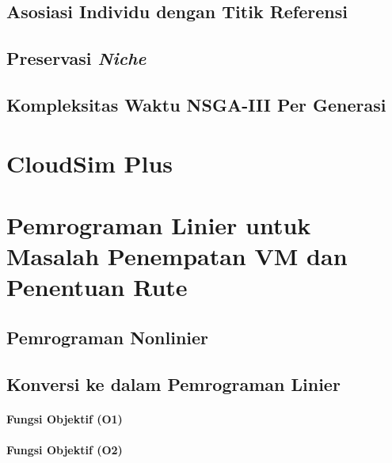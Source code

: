 \documentclass[ugmskripsi]{ugmskripsi}
\begin{document}
		\subsection{Asosiasi Individu dengan Titik Referensi}
			\label{asosiasi individu}
			
			
		\subsection{Preservasi \textit{Niche}}
			\label{preservasi niche}
			

		\subsection{Kompleksitas Waktu NSGA-III Per Generasi}
		\label{kompleksitas waktu}
		
	
	
	\section{CloudSim Plus}
	\label{CloudSim Plus}
	
	
	\section{Pemrograman Linier untuk Masalah Penempatan VM dan Penentuan Rute}
	\label{LP}

		\subsection{Pemrograman Nonlinier}
		\label{NLP}
		
		
		\subsection{Konversi ke dalam Pemrograman Linier}
		\label{konversi NLP ke MILP}
		
			\paragraph{Fungsi Objektif (O1)}
			\label{o1}	
			
			
			\paragraph{Fungsi Objektif (O2)}
			\label{o2}	
			
			
\end{document}
